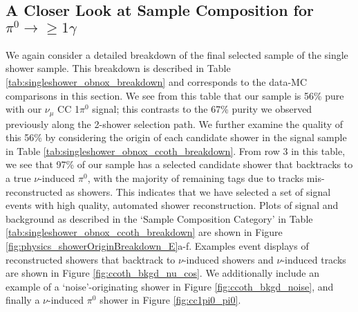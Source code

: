 \documentclass{article}
\begin{document}
\subsection{A Closer Look at Sample Composition for $\pi^0\rightarrow\geq 1 \gamma$} 
We again consider a detailed breakdown of the final selected sample of the single shower sample.  This breakdown is described in Table \ref{tab:singleshower_obnox_breakdown} and corresponds to the data-MC comparisons in this section. We see from this table that our sample is 56\% pure with our $\nu_\mu$ CC 1$\pi^0$ signal; this contrasts to the 67\% purity we observed previously along the 2-shower selection path.  We further examine the quality of this 56\% by considering the origin of each candidate shower in the signal sample in Table \ref{tab:singleshower_obnox_ccoth_breakdown}.  From row 3 in this table, we see that 97\% of our sample has a selected candidate shower that backtracks to a true $\nu$-induced $\pi^0$, with the majority of remaining tags due to tracks mis-reconstructed as showers. This indicates that we have selected a set of signal events with high quality, automated shower reconstruction.  Plots of signal and background as described in the `Sample Composition Category' in Table \ref{tab:singleshower_obnox_ccoth_breakdown} are shown in Figure \ref{fig:physics_showerOriginBreakdown_E}a-f. Examples event displays of reconstructed showers that backtrack to $\nu$-induced showers and $\nu$-induced tracks are shown in Figure \ref{fig:ccoth_bkgd_nu_cos}.  We additionally include an example of a `noise'-originating shower in Figure \ref{fig:ccoth_bkgd_noise}, and finally a $\nu$-induced $\pi^0$ shower in Figure \ref{fig:cc1pi0_pi0}.

\end{document}
